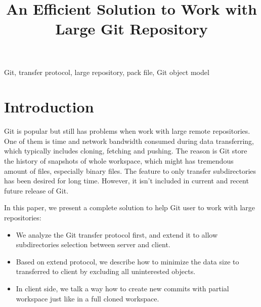 \documentclass[preprint]{sigplanconf}
\begin{document}
\title{An Efficient Solution to Work with Large Git Repository}
\maketitle
{}

\keywords
Git, transfer protocol, large repository, pack file, Git object model

\section{Introduction}
Git is popular but still has problems when work with large remote repositories.
One of them is time and network bandwidth consumed during data transferring, which typically includes cloning, fetching and pushing.
The reason is Git store the history of snapshots of whole workspace, which might has tremendous amount of files, especially binary files.
The feature to only transfer subdirectories has been desired for long time.
However, it isn't included in current and recent future release of Git.

In this paper, we present a complete solution to help Git user to work with large repositories:
\begin{itemize}
  \item We analyze the Git transfer protocol first, and extend it to allow subdirectories selection between server and client.
  \item Based on extend protocol, we describe how to minimize the data size to transferred to client by excluding all uninterested objects.
  \item In client side, we talk a way how to create new commits with partial workspace just like in a full cloned workspace.
\end{itemize}
\end{document}
